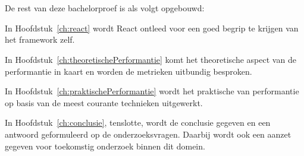 \section{}
\label{sec:opzetBachelorproef}


De rest van deze bachelorproef is als volgt opgebouwd:

In Hoofdstuk~\ref{ch:react} wordt React ontleed voor een goed begrip te krijgen van het framework zelf.

In Hoofdstuk~\ref{ch:theoretischePerformantie} komt het theoretische aspect van de performantie in kaart en worden de metrieken uitbundig besproken. 

In Hoofdstuk~\ref{ch:praktischePerformantie} wordt het praktische van performantie op basis van de meest courante technieken uitgewerkt.

In Hoofdstuk~\ref{ch:conclusie}, tenslotte, wordt de conclusie gegeven en een antwoord geformuleerd op de onderzoeksvragen. Daarbij wordt ook een aanzet gegeven voor toekomstig onderzoek binnen dit domein.